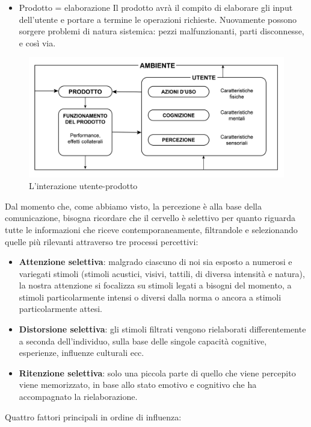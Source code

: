 \documentclass[11pt,a4paper]{article}
\begin{document}
\begin{itemize}
	\item Prodotto = elaborazione
		\tab Il prodotto avrà il compito di elaborare gli input dell’utente e portare a termine le operazioni richieste. Nuovamente possono sorgere problemi di natura sistemica: pezzi malfunzionanti, parti disconnesse, e così via.
\end{itemize}
\begin{figure}	
	\begin{center}
		\includegraphics[scale=0.4]{img/004.png}
	\end{center}
	\caption{L'interazione utente-prodotto}
\end{figure}
Dal momento che, come abbiamo visto, la percezione è alla base della comunicazione, bisogna ricordare che il cervello è selettivo per quanto riguarda tutte le informazioni che riceve contemporaneamente, filtrandole e selezionando quelle più rilevanti attraverso tre processi percettivi:
\begin{itemize}
	\item \textbf{Attenzione selettiva}: malgrado ciascuno di noi sia esposto a numerosi e variegati stimoli (stimoli acustici, visivi, tattili, di diversa intensità e natura), la nostra attenzione si focalizza su stimoli legati a bisogni del momento, a stimoli particolarmente intensi o diversi dalla norma o ancora a stimoli particolarmente attesi.
	\item \textbf{Distorsione selettiva}: gli stimoli filtrati vengono rielaborati differentemente a seconda dell'individuo, sulla base delle singole capacità cognitive, esperienze, influenze culturali ecc.
	\item \textbf{Ritenzione selettiva}: solo una piccola parte di quello che viene percepito viene memorizzato, in base allo stato emotivo e cognitivo che ha accompagnato la rielaborazione.
\end{itemize}
Quattro fattori principali in ordine di influenza:
\end{document}
